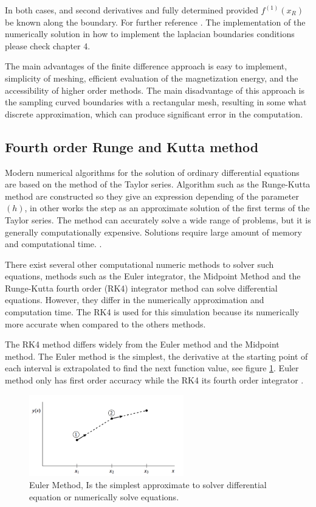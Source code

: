 In both cases, and second derivatives and fully determined provided $f^{(1)}(x_R)$ be known along the boundary. For further reference \cite{methods}. The implementation of the numerically solution in how to implement the laplacian boundaries conditions please check chapter 4.

The main advantages of the finite difference approach is easy to implement, simplicity of meshing, efficient evaluation of the magnetization energy, and the accessibility of higher order methods. The main disadvantage of this approach is the sampling curved boundaries with a rectangular mesh, resulting in some what discrete approximation, which can produce significant error in the computation.

\subsection{Fourth order Runge and Kutta method}

 Modern numerical algorithms for the solution of ordinary differential equations are based on the method of the Taylor series. Algorithm such as the Runge-Kutta method are constructed so they give an expression depending of the parameter $(h)$, in other works the step as an approximate solution of the first terms of the Taylor series. The method can accurately solve a wide range of problems, but it is generally computationally expensive. Solutions require large amount of memory and computational time. \cite{numerical}.

There exist several other computational numeric methods to solver such equations, methods such as the Euler integrator, the Midpoint Method and the Runge-Kutta fourth order (RK4) integrator method can solve differential equations. However, they differ in the numerically approximation and computation time. The RK4 is used for this simulation because its numerically more accurate when compared to the others methods.

The RK4 method differs widely from the Euler method and the Midpoint method. The Euler method is the simplest, the derivative at the starting point of each interval is extrapolated to find the next function value, see figure \ref{fig:euler}. Euler method only has first order accuracy while the RK4 its fourth order integrator \cite{numerical}.

\begin{figure}[htbp]
	\centering
		\includegraphics[width=0.6\textwidth]{Figures/euler.png}
		\smallskip
	\caption[Euler Method]{Euler Method, Is the simplest approximate to solver differential equation or numerically solve equations.}
	\label{fig:euler}
\end{figure}

